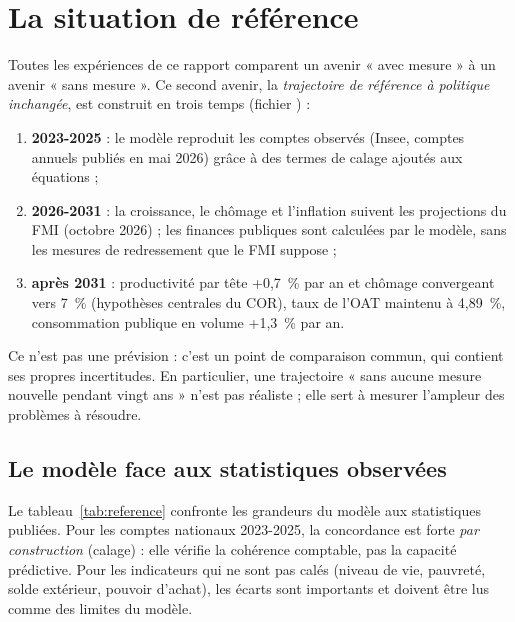 \chapter{La situation de référence}
\label{ch:reference}

Toutes les expériences de ce rapport comparent un avenir « avec mesure » à un avenir « sans mesure ». Ce second
avenir, la \emph{trajectoire de référence à politique inchangée}, est construit en trois temps (fichier
) :
\begin{enumerate}
\item \textbf{2023-2025} : le modèle reproduit les comptes observés (Insee, comptes annuels publiés en mai 2026) grâce à
des termes de calage ajoutés aux équations ;
\item \textbf{2026-2031} : la croissance, le chômage et l'inflation suivent les projections du FMI (octobre 2026) ; les
finances publiques sont calculées par le modèle, sans les mesures de redressement que le FMI suppose ;
\item \textbf{après 2031} : productivité par tête +0,7~\% par an et chômage convergeant vers 7~\% (hypothèses centrales
du COR), taux de l'OAT maintenu à 4,89~\%, consommation publique en volume +1,3~\% par an.
\end{enumerate}
Ce n'est pas une prévision : c'est un point de comparaison commun, qui contient ses propres incertitudes. En
particulier, une trajectoire « sans aucune mesure nouvelle pendant vingt ans » n'est pas réaliste ; elle sert à mesurer
l'ampleur des problèmes à résoudre.

\section{Le modèle face aux statistiques observées}

Le tableau~\ref{tab:reference} confronte les grandeurs du modèle aux statistiques publiées. Pour les comptes
nationaux 2023-2025, la concordance est forte \emph{par construction} (calage) : elle vérifie la cohérence comptable,
pas la capacité prédictive. Pour les indicateurs qui ne sont pas calés (niveau de vie, pauvreté, solde extérieur,
pouvoir d'achat), les écarts sont importants et doivent être lus comme des limites du modèle.

